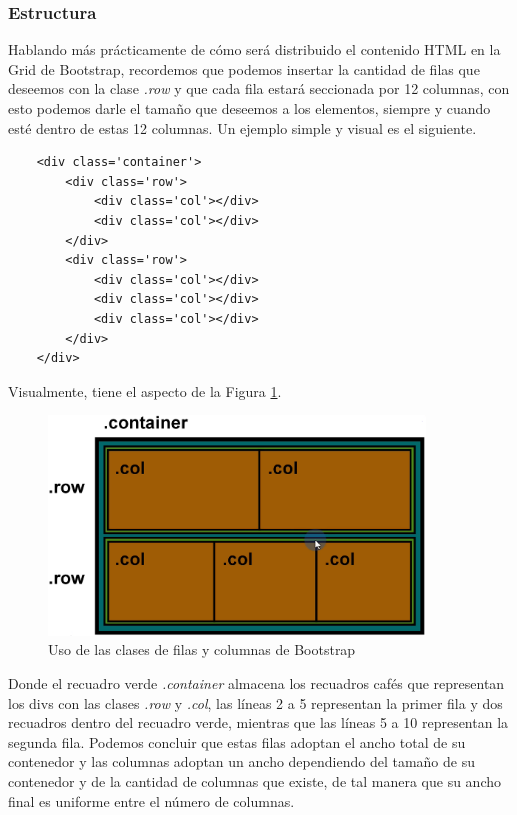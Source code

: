\subsubsection{Estructura}

Hablando más prácticamente de cómo será distribuido el contenido HTML en la Grid de Bootstrap, recordemos que podemos insertar la cantidad de filas que deseemos con la clase \textit{.row} y que cada fila estará seccionada por 12 columnas, con esto podemos darle el tamaño que deseemos a los elementos, siempre y cuando esté dentro de estas 12 columnas. Un ejemplo simple y visual es el siguiente.
\begin{lstlisting}
    <div class='container'>
        <div class='row'>
            <div class='col'></div>
            <div class='col'></div>
        </div>
        <div class='row'>
            <div class='col'></div>
            <div class='col'></div>
            <div class='col'></div>
        </div>
    </div>
\end{lstlisting}

Visualmente, tiene el aspecto de la Figura \ref{fig:9}.
\begin{figure}[H]
    \centering
    \caption{Uso de las clases de filas y columnas de Bootstrap}
    \label{fig:9}
    \includegraphics[width=10cm]{ss/grid-estructura.png}
\end{figure}

Donde el recuadro verde \textit{.container} almacena los recuadros cafés que representan los divs con las clases \textit{.row} y \textit{.col}, las líneas 2 a 5 representan la primer fila y dos recuadros dentro del recuadro verde, mientras que las líneas 5 a 10 representan la segunda fila. Podemos concluir que estas filas adoptan el ancho total de su contenedor y las columnas adoptan un ancho dependiendo del tamaño de su contenedor y de la cantidad de columnas que existe, de tal manera que su ancho final es uniforme entre el número de columnas.


